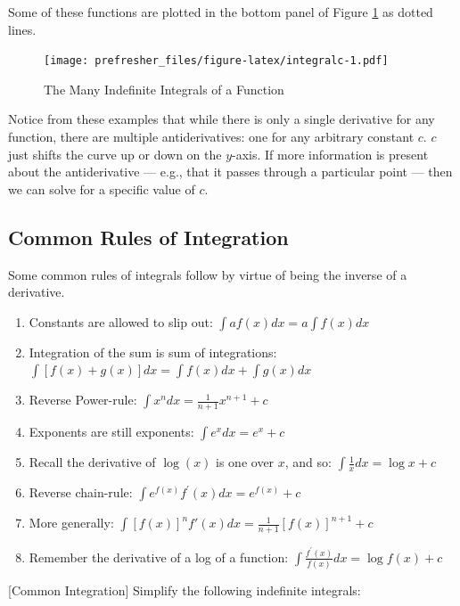 \documentclass[]{book}
\providecommand{\tightlist}{%
  \setlength{\itemsep}{0pt}\setlength{\parskip}{0pt}}
\theoremstyle{definition}
\theoremstyle{definition}
\theoremstyle{definition}
\theoremstyle{remark}
\begin{document}
Some of these functions are plotted in the bottom panel of Figure \ref{fig:integralc} as dotted lines.

\begin{figure}
\centering
\texttt{[image: prefresher\_files/figure-latex/integralc-1.pdf]}
\caption{\label{fig:integralc}The Many Indefinite Integrals of a Function}
\end{figure}

Notice from these examples that while there is only a single derivative for any function, there are multiple antiderivatives: one for any arbitrary constant \(c\). \(c\) just shifts the curve up or down on the \(y\)-axis. If more information is present about the antiderivative --- e.g., that it passes through a particular point --- then we can solve for a specific value of \(c\).

\hypertarget{common-rules-of-integration}{%
\subsection*{Common Rules of Integration}\label{common-rules-of-integration}}

Some common rules of integrals follow by virtue of being the inverse of a derivative.

\begin{enumerate}
\def\labelenumi{\arabic{enumi}.}
\tightlist
\item
  Constants are allowed to slip out: \(\int a f(x)dx = a\int f(x)dx\)
\item
  Integration of the sum is sum of integrations: \(\int [f(x)+g(x)]dx=\int f(x)dx + \int g(x)dx\)
\item
  Reverse Power-rule: \(\int x^n dx = \frac{1}{n+1} x^{n+1} + c\)
\item
  Exponents are still exponents: \(\int e^x dx = e^x +c\)
\item
  Recall the derivative of \(\log(x)\) is one over \(x\), and so: \(\int \frac{1}{x} dx = \log x + c\)
\item
  Reverse chain-rule: \(\int e^{f(x)}f^\prime(x)dx = e^{f(x)}+c\)
\item
  More generally: \(\int [f(x)]^n f'(x)dx = \frac{1}{n+1}[f(x)]^{n+1}+c\)
\item
  Remember the derivative of a log of a function: \(\int \frac{f^\prime(x)}{f(x)}dx=\log f(x) + c\)
\end{enumerate}

[Common Integration]
\protect\hypertarget{exm:unnamed-chunk-25}{}{\label{exm:unnamed-chunk-25} {} }Simplify the following indefinite integrals:
\end{document}
